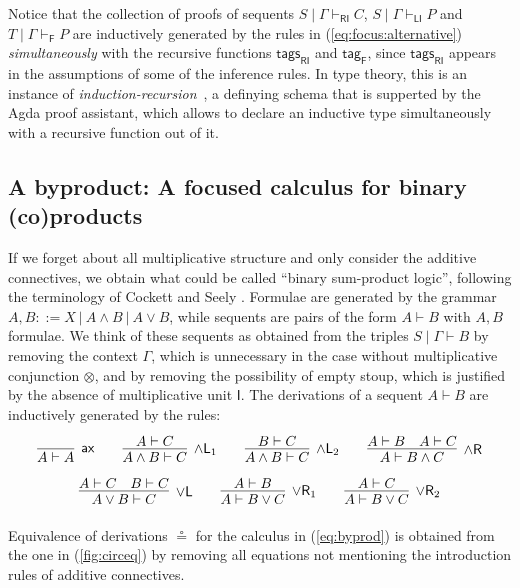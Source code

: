 \documentclass[submission,copyright,creativecommons]{eptcs}
\theoremstyle{definition}
\newcommand{\andlone}{\land \mathsf{L}_{1}}
\newcommand{\andltwo}{\land \mathsf{L}_{2}}
\newcommand{\andr}{\land \mathsf{R}}
\newcommand{\orl}{\lor \mathsf{L}}
\newcommand{\orrone}{\lor \mathsf{R}_{1}}
\newcommand{\orrtwo}{\lor \mathsf{R}_{2}}
\newcommand{\ax}{\mathsf{ax}}
\newcommand{\I}{\mathsf{I}}
\newcommand{\RI}{\mathsf{RI}}
\newcommand{\LI}{\mathsf{LI}}
\newcommand{\F}{\mathsf{F}}
\begin{document}
Notice that the collection of proofs of sequents $S \mid \Gamma \vdash_\RI C$, $S \mid \Gamma \vdash_\LI P$ and $T \mid \Gamma \vdash_\F P$ are inductively generated by the rules in (\ref{eq:focus:alternative}) \emph{simultaneously} with the recursive functions $\mathsf{tags}_{\RI}$ and $\mathsf{tag}_{\F}$, since $\mathsf{tags}_{\RI}$ appears in the assumptions of some of the inference rules. In type theory, this is an instance of \emph{induction-recursion}~\cite{Dybjer00}, a definying schema that is supperted by the Agda proof assistant, which allows to declare an inductive type simultaneously with a recursive function out of it.

\subsection{A byproduct: A focused calculus for binary (co)products}\label{subsec:byprod}

If we forget about all multiplicative structure and only consider the additive connectives, we obtain what could be called ``binary sum-product logic'', following the terminology of Cockett and Seely \cite{CS01}. Formulae are generated by the grammar
$A,B ::= X \ | \ A \land B \ | \ A \lor B$, while sequents are pairs of the form $A \vdash B$ with $A,B$ formulae. We think of these sequents as obtained from the triples $S \mid \Gamma \vdash B$ by removing the context $\Gamma$, which is unnecessary in the case without multiplicative conjunction $\otimes$, and 
by removing the possibility of empty stoup, which is justified by the absence of multiplicative unit $\I$.
The derivations of a sequent $A \vdash B$ are inductively generated by the rules:
\begin{equation}\label{eq:byprod}
  \def\arraystretch{2.5}
  \begin{array}{c}
    \infer[\ax]{A \vdash A}{}
    \qquad
    \infer[\andlone]{A \land B \vdash C}{A \vdash C}
    \qquad
    \infer[\andltwo]{A \land B \vdash C}{B \vdash C}
    \qquad
    \infer[\andr]{A \vdash B \land C}{
      A \vdash B
      &
      A \vdash C
    }
    \\
    \infer[\orl]{A \lor B \vdash C}{
      A \vdash C
      &
      B \vdash C
    }
    \qquad
    \infer[\orrone]{A \vdash B \lor C}{A \vdash B}
    \qquad
    \infer[\orrtwo]{A \vdash B \lor C}{A \vdash C}
  \end{array}
\end{equation}
Equivalence of derivations $\circeq$ for the calculus in (\ref{eq:byprod}) is obtained from the one in (\ref{fig:circeq}) by removing all equations not mentioning the introduction rules of additive connectives.
\end{document}
